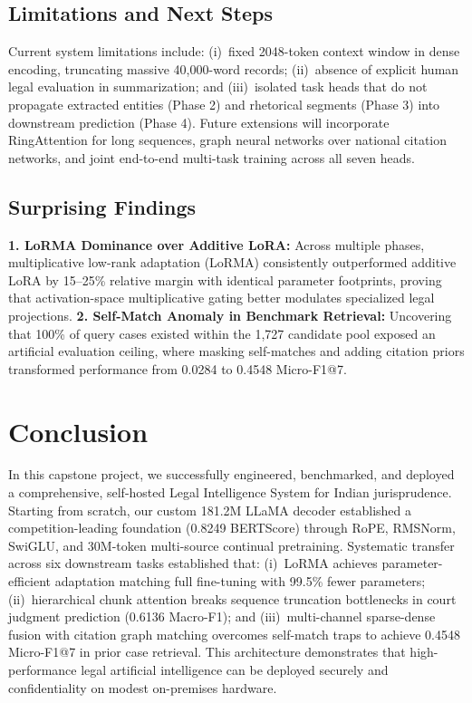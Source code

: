 \documentclass[11pt, oneside]{article}
\begin{document}
\subsection{Limitations and Next Steps}
Current system limitations include: (i)~fixed 2048-token context window in dense encoding, truncating massive 40,000-word records; (ii)~absence of explicit human legal evaluation in summarization; and (iii)~isolated task heads that do not propagate extracted entities (Phase 2) and rhetorical segments (Phase 3) into downstream prediction (Phase 4). Future extensions will incorporate RingAttention for long sequences, graph neural networks over national citation networks, and joint end-to-end multi-task training across all seven heads.

\subsection{Surprising Findings}
\noindent
\textbf{1. LoRMA Dominance over Additive LoRA:} Across multiple phases, multiplicative low-rank adaptation (LoRMA) consistently outperformed additive LoRA by 15--25\% relative margin with identical parameter footprints, proving that activation-space multiplicative gating better modulates specialized legal projections.
\textbf{2. Self-Match Anomaly in Benchmark Retrieval:} Uncovering that 100\% of query cases existed within the 1,727 candidate pool exposed an artificial evaluation ceiling, where masking self-matches and adding citation priors transformed performance from 0.0284 to 0.4548 Micro-F1@7.

\section{Conclusion}
In this capstone project, we successfully engineered, benchmarked, and deployed a comprehensive, self-hosted Legal Intelligence System for Indian jurisprudence. Starting from scratch, our custom 181.2M LLaMA decoder established a competition-leading foundation (0.8249 BERTScore) through RoPE, RMSNorm, SwiGLU, and 30M-token multi-source continual pretraining. Systematic transfer across six downstream tasks established that: (i)~LoRMA achieves parameter-efficient adaptation matching full fine-tuning with 99.5\% fewer parameters; (ii)~hierarchical chunk attention breaks sequence truncation bottlenecks in court judgment prediction (0.6136 Macro-F1); and (iii)~multi-channel sparse-dense fusion with citation graph matching overcomes self-match traps to achieve 0.4548 Micro-F1@7 in prior case retrieval. This architecture demonstrates that high-performance legal artificial intelligence can be deployed securely and confidentiality on modest on-premises hardware.
\end{document}
